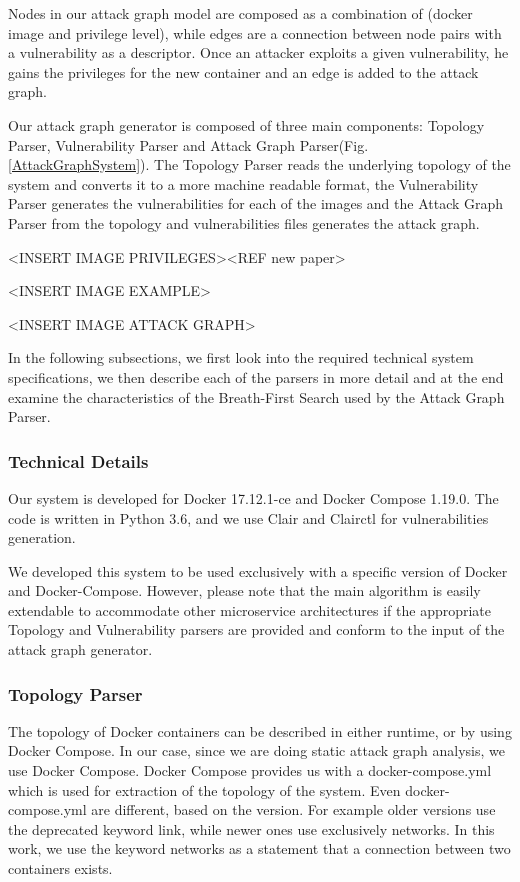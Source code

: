 \documentclass[letterpaper, 10 pt, conference]{ieeeconf}  %
\begin{document}
Nodes in our attack graph model are composed as a combination of (docker image and privilege level), while edges are a connection between node pairs with a vulnerability as a descriptor. Once an attacker exploits a given vulnerability, he gains the privileges for the new container and an edge is added to the attack graph.

Our attack graph generator is composed of three main components: Topology Parser, Vulnerability Parser and Attack Graph Parser(Fig. \ref{AttackGraphSystem}). The Topology Parser reads the underlying topology of the system and converts it to a more machine readable format, the Vulnerability Parser generates the vulnerabilities for each of the images and the Attack Graph Parser from the topology and vulnerabilities files generates the attack graph. 

<INSERT IMAGE PRIVILEGES><REF new paper>

<INSERT IMAGE EXAMPLE>

<INSERT IMAGE ATTACK GRAPH>


In the following subsections, we first look into the required technical system specifications, we then describe each of the parsers in more detail and at the end examine the characteristics of the Breath-First Search used by the Attack Graph Parser.

\subsubsection{Technical Details}
Our system is developed for Docker 17.12.1-ce and Docker Compose 1.19.0. The code is written in Python 3.6, and we use Clair and Clairctl for vulnerabilities generation.

We developed this system to be used exclusively with a specific version of Docker and Docker-Compose. However, please note that the main algorithm is easily extendable  to accommodate other microservice architectures if the appropriate Topology and Vulnerability parsers are provided and conform to the input of the attack graph generator.

\subsubsection{Topology Parser}
The topology of Docker containers can be described in either runtime, or by using Docker Compose. In our case, since we are doing static attack graph analysis, we use Docker Compose. Docker Compose provides us with a docker-compose.yml which is used for extraction of the topology of the system. Even docker-compose.yml are different, based on the version. For example older versions use the deprecated keyword link, while newer ones use exclusively networks. In this work, we use the keyword networks as a statement that a connection between two containers exists.
\end{document}

